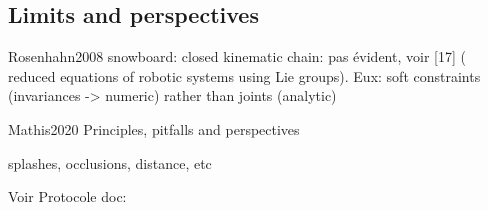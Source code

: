\subsection{Limits and perspectives}


Rosenhahn2008 snowboard: closed kinematic chain: pas évident, voir [17] ( reduced equations of robotic systems using Lie groups). Eux: soft constraints (invariances -> numeric) rather than joints (analytic)

Mathis2020 Principles, pitfalls and perspectives

splashes, occlusions, distance, etc

Voir Protocole doc: %
